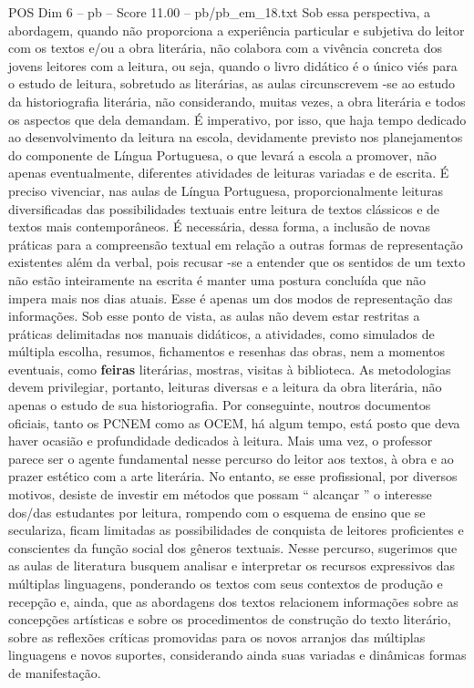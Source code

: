 \begin{textsample}{POS Dim 6 – pb – Score 11.00 – pb/pb\_em\_18.txt}
Sob essa perspectiva, a abordagem, quando não proporciona a experiência particular e subjetiva do leitor com os textos e/ou a obra literária, não colabora com a vivência concreta dos jovens leitores com a leitura, ou seja, quando o livro didático é o único viés para o estudo de leitura, sobretudo as literárias, as aulas circunscrevem -se ao estudo da historiografia literária, não considerando, muitas vezes, a obra literária e todos os aspectos que dela demandam.
É imperativo, por isso, que haja tempo dedicado ao desenvolvimento da leitura na escola, devidamente previsto nos planejamentos do componente de Língua Portuguesa, o que levará a escola a promover, não apenas eventualmente, diferentes atividades de leituras variadas e de escrita.
É preciso vivenciar, nas aulas de Língua Portuguesa, proporcionalmente leituras diversificadas das possibilidades textuais entre leitura de textos clássicos e de textos mais contemporâneos.
É necessária, dessa forma, a inclusão de novas práticas para a compreensão textual em relação a outras formas de representação existentes além da verbal, pois recusar -se a entender que os sentidos de um texto não estão inteiramente na escrita é manter uma postura concluída que não impera mais nos dias atuais.
Esse é apenas um dos modos de representação das informações.
Sob esse ponto de vista, as aulas não devem estar restritas a práticas delimitadas nos manuais didáticos, a atividades, como simulados de múltipla escolha, resumos, fichamentos e resenhas das obras, nem a momentos eventuais, como \textbf{feiras} literárias, mostras, visitas à biblioteca.
As metodologias devem privilegiar, portanto, leituras diversas e a leitura da obra literária, não apenas o estudo de sua historiografia.
Por conseguinte, noutros documentos oficiais, tanto os PCNEM como as OCEM, há algum tempo, está posto que deva haver ocasião e profundidade dedicados à leitura.
Mais uma vez, o professor parece ser o agente fundamental nesse percurso do leitor aos textos, à obra e ao prazer estético com a arte literária.
No entanto, se esse profissional, por diversos motivos, desiste de investir em métodos que possam “ alcançar ” o interesse dos/das estudantes por leitura, rompendo com o esquema de ensino que se seculariza, ficam limitadas as possibilidades de conquista de leitores proficientes e conscientes da função social dos gêneros textuais.
Nesse percurso, sugerimos que as aulas de literatura busquem analisar e interpretar os recursos expressivos das múltiplas linguagens, ponderando os textos com seus contextos de produção e recepção e, ainda, que as abordagens dos textos relacionem informações sobre as concepções artísticas e sobre os procedimentos de construção do texto literário, sobre as reflexões críticas promovidas para os novos arranjos das múltiplas linguagens e novos suportes, considerando ainda suas variadas e dinâmicas formas de manifestação.

\end{textsample}
